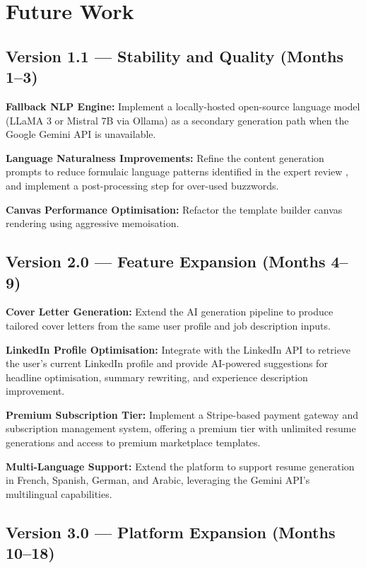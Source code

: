 \documentclass[12pt, a4paper, oneside]{report}
\begin{document}
\section{Future Work}

\subsection{Version 1.1 --- Stability and Quality (Months 1--3)}

\textbf{Fallback NLP Engine:} Implement a locally-hosted open-source language model (LLaMA 3 or Mistral 7B via Ollama) as a secondary generation path when the Google Gemini API \cite{gemini2023} is unavailable.

\textbf{Language Naturalness Improvements:} Refine the content generation prompts to reduce formulaic language patterns identified in the expert review \cite{brown2020}, and implement a post-processing step for over-used buzzwords.

\textbf{Canvas Performance Optimisation:} Refactor the template builder canvas rendering using aggressive memoisation.

\subsection{Version 2.0 --- Feature Expansion (Months 4--9)}

\textbf{Cover Letter Generation:} Extend the AI generation pipeline \cite{gemini2023} to produce tailored cover letters from the same user profile and job description inputs.

\textbf{LinkedIn Profile Optimisation:} Integrate with the LinkedIn API to retrieve the user's current LinkedIn profile and provide AI-powered suggestions for headline optimisation, summary rewriting, and experience description improvement.

\textbf{Premium Subscription Tier:} Implement a Stripe-based payment gateway and subscription management system, offering a premium tier with unlimited resume generations and access to premium marketplace templates.

\textbf{Multi-Language Support:} Extend the platform to support resume generation in French, Spanish, German, and Arabic, leveraging the Gemini API's \cite{gemini2023} multilingual capabilities.

\subsection{Version 3.0 --- Platform Expansion (Months 10--18)}
\end{document}
